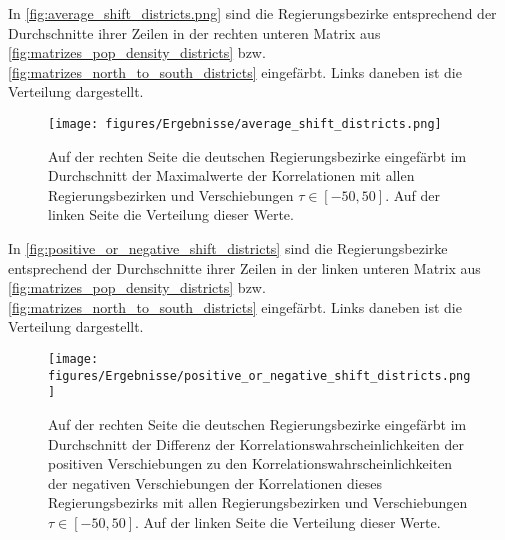 In \autoref{fig:average_shift_districts.png} sind die Regierungsbezirke entsprechend der Durchschnitte ihrer Zeilen in der rechten unteren Matrix aus \autoref{fig:matrizes_pop_density_districts} bzw. \autoref{fig:matrizes_north_to_south_districts} eingefärbt. Links daneben ist die Verteilung dargestellt.

\begin{figure}[H]
    \centering
    \texttt{[image: figures/Ergebnisse/average\_shift\_districts.png]}
    \caption{Auf der rechten Seite die deutschen Regierungsbezirke eingefärbt im Durchschnitt der Maximalwerte der Korrelationen mit allen Regierungsbezirken und Verschiebungen $\tau\in[-50,50]$. Auf der linken Seite die Verteilung dieser Werte.}
    \label{fig:average_shift_districts.png}
\end{figure}

In \autoref{fig:positive_or_negative_shift_districts} sind die Regierungsbezirke entsprechend der Durchschnitte ihrer Zeilen in der linken unteren Matrix aus \autoref{fig:matrizes_pop_density_districts} bzw. \autoref{fig:matrizes_north_to_south_districts} eingefärbt. Links daneben ist die Verteilung dargestellt.

\begin{figure}[H]
    \centering
    \texttt{[image: figures/Ergebnisse/positive\_or\_negative\_shift\_districts.png]}
    \caption{Auf der rechten Seite die deutschen Regierungsbezirke eingefärbt im Durchschnitt der Differenz der Korrelationswahrscheinlichkeiten der positiven Verschiebungen zu den Korrelationswahrscheinlichkeiten der negativen Verschiebungen der Korrelationen dieses Regierungsbezirks mit allen Regierungsbezirken und Verschiebungen $\tau\in[-50,50]$. Auf der linken Seite die Verteilung dieser Werte.}
    \label{fig:positive_or_negative_shift_districts}
\end{figure}

